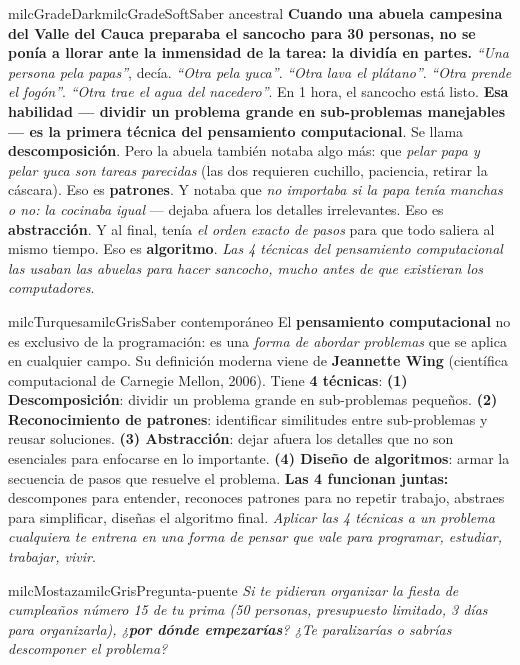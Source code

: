 \documentclass[11pt,letterpaper]{article}
\begin{document}
\begin{softbox}{milcGradeDark}{milcGradeSoft}{Saber ancestral}
\textbf{Cuando una abuela campesina del Valle del Cauca preparaba el sancocho para 30 personas, no se ponía a llorar ante la inmensidad de la tarea: la dividía en partes.} \emph{``Una persona pela papas''}, decía. \emph{``Otra pela yuca''}. \emph{``Otra lava el plátano''}. \emph{``Otra prende el fogón''}. \emph{``Otra trae el agua del nacedero''}. En 1 hora, el sancocho está listo. \textbf{Esa habilidad --- dividir un problema grande en sub-problemas manejables --- es la primera técnica del pensamiento computacional}. Se llama \textbf{descomposición}. Pero la abuela también notaba algo más: que \emph{pelar papa y pelar yuca son tareas parecidas} (las dos requieren cuchillo, paciencia, retirar la cáscara). Eso es \textbf{patrones}. Y notaba que \emph{no importaba si la papa tenía manchas o no: la cocinaba igual} --- dejaba afuera los detalles irrelevantes. Eso es \textbf{abstracción}. Y al final, tenía \emph{el orden exacto de pasos} para que todo saliera al mismo tiempo. Eso es \textbf{algoritmo}. \emph{Las 4 técnicas del pensamiento computacional las usaban las abuelas para hacer sancocho, mucho antes de que existieran los computadores}.
\end{softbox}

\begin{softbox}{milcTurquesa}{milcGris}{Saber contemporáneo}
El \textbf{pensamiento computacional} no es exclusivo de la programación: es una \emph{forma de abordar problemas} que se aplica en cualquier campo. Su definición moderna viene de \textbf{Jeannette Wing} (científica computacional de Carnegie Mellon, 2006). Tiene \textbf{4 técnicas}: \textbf{(1) Descomposición}: dividir un problema grande en sub-problemas pequeños. \textbf{(2) Reconocimiento de patrones}: identificar similitudes entre sub-problemas y reusar soluciones. \textbf{(3) Abstracción}: dejar afuera los detalles que no son esenciales para enfocarse en lo importante. \textbf{(4) Diseño de algoritmos}: armar la secuencia de pasos que resuelve el problema. \textbf{Las 4 funcionan juntas:} descompones para entender, reconoces patrones para no repetir trabajo, abstraes para simplificar, diseñas el algoritmo final. \emph{Aplicar las 4 técnicas a un problema cualquiera te entrena en una forma de pensar que vale para programar, estudiar, trabajar, vivir}.
\end{softbox}

\begin{softbox}{milcMostaza}{milcGris}{Pregunta-puente}
\textit{Si te pidieran organizar la \emph{fiesta de cumpleaños número 15} de tu prima (50 personas, presupuesto limitado, 3 días para organizarla), ¿\textbf{por dónde empezarías}? ¿Te paralizarías o sabrías descomponer el problema?}
\end{softbox}
\end{document}

